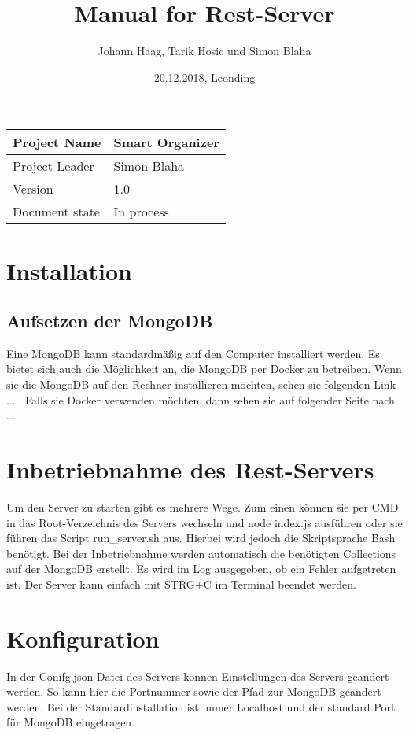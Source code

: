 \documentclass[12pt]{scrartcl}
\title{Manual for Rest-Server}
\author{Johann Haag, Tarik Hosic und Simon Blaha}
\date{20.12.2018, Leonding}
\begin{document}
    \maketitle
    \begin{flushleft}
    \begin{tabular}{|l|l|}
    \hline
    Project Name & Smart Organizer \\ \hline
    Project Leader & Simon Blaha \\ \hline
    Version & 1.0\\ \hline
    Document state & In process \\ \hline
    \end{tabular}
    \end{flushleft}

    \pagebreak
    \tableofcontents
    \pagebreak

    \section{Installation}
    \subsection{Aufsetzen der MongoDB}
        Eine MongoDB kann standardmäßig auf den Computer installiert werden. Es bietet sich auch die Möglichkeit an, die MongoDB per Docker zu betreiben.
        Wenn sie die MongoDB auf den Rechner installieren möchten, sehen sie folgenden Link .....
        Falls sie Docker verwenden möchten, dann sehen sie auf folgender Seite nach ....

    \section{Inbetriebnahme des Rest-Servers}
        Um den Server zu starten gibt es mehrere Wege. 
        Zum einen können sie per CMD in das Root-Verzeichnis des Servers wechseln und node index.js ausführen oder 
        sie führen das Script run_server.sh aus. Hierbei wird jedoch die Skriptsprache Bash benötigt.
        Bei der Inbetriebnahme werden automatisch die benötigten Collections auf der MongoDB erstellt. 
        Es wird im Log ausgegeben, ob ein Fehler aufgetreten ist.
        Der Server kann einfach mit STRG+C im Terminal beendet werden.

    \section{Konfiguration}
        In der Conifg.json Datei des Servers können Einstellungen des Servers geändert werden.
        So kann hier die Portnummer sowie der Pfad zur MongoDB geändert werden.
        Bei der Standardinstallation ist immer Localhost und der standard Port für MongoDB eingetragen.
\end{document}
